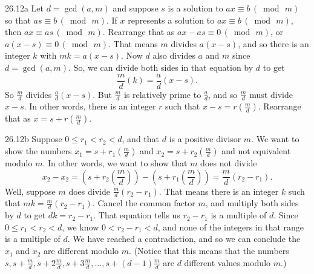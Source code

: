 \begin{Solution}{26.12a}
Let $d = \gcd(a,m)$ and suppose $s$ is a solution to $ax\equiv b\, (\bmod\,m)$ so that 
$as\equiv b\, (\bmod\,m)$.  If $x$ represents a solution to $ax\equiv b\, (\bmod\,m)$,
then $ax \equiv as \, (\bmod\,m)$. Rearrange that as $ax-as \equiv 0\,(\bmod\,m)$, or
$a(x-s) \equiv 0\,(\bmod\,m)$.  That means $m$ divides $a(x-s)$, and so there is an integer $k$
with $mk = a(x-s)$. Now $d$ also divides $a$ and $m$ since $d = \gcd(a,m)$. 
So, we can divide both sides in that equation by $d$ to get
\[
\frac{m}{d} (k) = \frac{a}{d}(x-s).
\]
So $\frac{m}{d}$ divides $\frac{a}{d}(x-s)$. But $\frac{m}{d}$ is relatively prime to $\frac{a}{d}$, and so 
$\frac{m}{d}$ must divide $x-s$. In other words, there is an integer $r$ such that 
$x-s = r(\frac{m}{d})$. Rearrange that as $x = s + r(\frac{m}{d})$. 

\end{Solution}

\begin{Solution}{26.12b}
Suppose $0\leq r_1 < r_2 < d$, and that $d$ is a positive divisor $m$. We want to show the numbers $x_1= s+r_1(\frac{m}{d})$ and $x_2= s+r_2(\frac{m}{d})$ and not equivalent modulo $m$. In other words, we want to show that $m$ does not divide 
\[
x_2 - x_2 = (s+r_2(\frac{m}{d}))- (s+r_1(\frac{m}{d})) = \frac{m}{d}(r_2 - r_1).
\]
Well, suppose $m$ does divide $\frac{m}{d}(r_2 - r_1)$. That means there is an integer $k$ such that
$mk = \frac{m}{d}(r_2 - r_1)$. Cancel the common factor $m$, and multiply both sides by $d$ to get
$dk = r_2-r_1$. That equation tells us $r_2-r_1$ is a multiple of $d$. Since $0\leq r_1 < r_2 < d$,
we know $0<r_2-r_1<d$, and none of the integers in that range is a multiple of $d$. We have reached a
contradiction, and so we can conclude the $x_1$ and $x_2$ are different modulo $m$. (Notice that this means 
that the numbers $s, s+\frac{m}{d}, s+2\frac{m}{d}, s+3\frac{m}{d},\ldots,s+(d-1)\frac{m}{d}$ are $d$ different
values modulo $m$.)
 
\end{Solution}